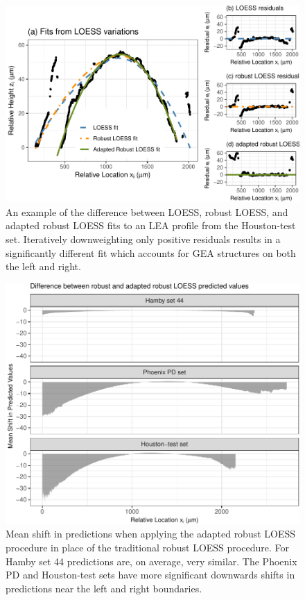 \documentclass[12pt]{article}
\begin{document}
\begin{figure}
\centering
\includegraphics{writeup_files/figure-latex/houston-adapted-rlo-1.pdf}
\caption{\label{houston-adapted-rlo} An example of the difference
between LOESS, robust LOESS, and adapted robust LOESS fits to an LEA
profile from the Houston-test set. Iteratively downweighting only
positive residuals results in a significantly different fit which
accounts for GEA structures on both the left and right.}
\end{figure}

\begin{figure}
\centering
\includegraphics{writeup_files/figure-latex/adapted-rlo-shift-1.pdf}
\caption{\label{adapted-rlo-shift}Mean shift in predictions when
applying the adapted robust LOESS procedure in place of the traditional
robust LOESS procedure. For Hamby set 44 predictions are, on average,
very similar. The Phoenix PD and Houston-test sets have more significant
downwards shifts in predictions near the left and right boundaries.}
\end{figure}
\end{document}
